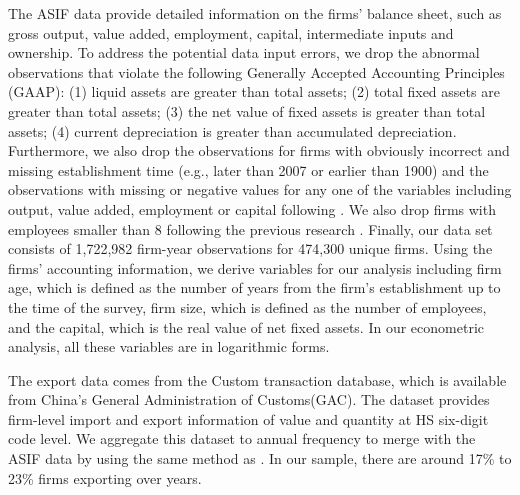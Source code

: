 \documentclass[12pt]{article}
\begin{document}
The ASIF data provide detailed information on the firms' balance sheet, such as gross output, value added,
employment, capital, intermediate inputs and ownership. 
To address the potential data input errors, we drop the abnormal observations that violate the following Generally Accepted Accounting Principles (GAAP): (1) liquid assets are greater than total assets; (2)
total fixed assets are greater than total assets; (3) the net value of fixed
assets is greater than total assets; (4) current depreciation is greater
than accumulated depreciation. Furthermore, we also drop the observations for firms with obviously incorrect and missing 
establishment time (e.g., later than 2007 or earlier than 1900) and the observations
with missing or negative values for any one of the variables including output, value added, employment or capital following \cite{cai2009competition,yu2015processing}. We also drop
firms with employees smaller than 8 following the previous research \citep{brandt2012creative}. Finally, our data set consists of 1,722,982 firm-year observations for 474,300 unique firms. Using the firms' accounting information, we derive variables for our analysis including firm age, which is defined as the number of years from the firm's establishment up to the time of the survey, 
firm size, which is defined as the number of employees, and the capital,
which is the real value of net fixed assets. In our econometric analysis, all these variables are in logarithmic forms. 

The export data comes from the Custom transaction database, which is available from China's General Administration of
Customs(GAC). The dataset provides firm-level import and export information of value and quantity
at HS six-digit code level. We aggregate this dataset to
annual frequency to merge with the ASIF data by using the same method as %
\citep{yu2015processing}. In our sample, there are around 17\% to
23\% firms exporting over years.
\end{document}
